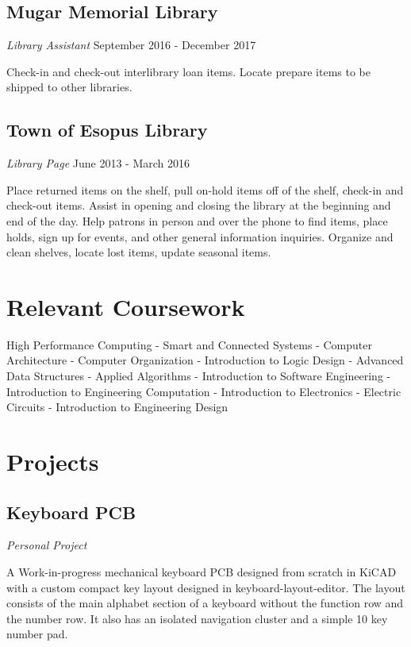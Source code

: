 \documentclass{article}
\begin{document}
\subsection{Mugar Memorial Library} \textit{Library Assistant}
  September 2016 - December 2017

Check-in and check-out interlibrary loan items. Locate prepare items to be shipped to other libraries.
\vspace{-.75em}
\subsection{Town of Esopus Library} \textit{Library Page}
  June 2013 - March 2016

Place returned items on the shelf, pull on-hold items off of the shelf, check-in and check-out items. Assist in opening and closing the library at the beginning and end of the day. Help patrons in person and over the phone to find items, place holds, sign up for events, and other general information inquiries. Organize and clean shelves, locate lost items, update seasonal items.

\vspace{-.75em}
\section{Relevant Coursework}
{\centering
High Performance Computing - Smart and Connected Systems - Computer Architecture - Computer Organization - Introduction to Logic Design - Advanced Data Structures - Applied Algorithms - Introduction to Software Engineering - Introduction to Engineering Computation - Introduction to Electronics - Electric Circuits - Introduction to Engineering Design
\par
}

\vspace{-.75em}
\section{Projects}
\subsection{Keyboard PCB} \textit{Personal Project}

A Work-in-progress mechanical keyboard PCB designed from scratch in KiCAD with a custom compact key layout designed in keyboard-layout-editor. The layout consists of the main alphabet section of a keyboard without the function row and the number row. It also has an isolated navigation cluster and a simple 10 key number pad.
\vspace{-.75em}
\end{document}
